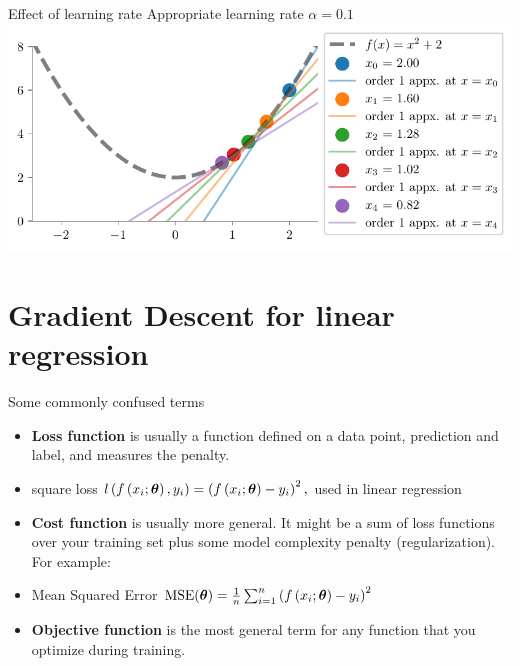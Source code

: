 \documentclass[usenames,dvipsnames]{beamer}
\begin{document}
    \begin{frame}{Effect of learning rate}
        Appropriate learning rate $\alpha=0.1$
        \includegraphics[scale=0.8]{../../maths/assets/mathematical-ml/figures/gd-lr-0.1.pdf}
      \end{frame}

  \section{Gradient Descent for linear regression}
  \begin{frame}{Some commonly confused terms}

    \begin{itemize}[<+->]
        \item \textbf{Loss function} is usually a function defined on a data point, prediction and label, and measures the penalty. 
        \item square loss \(l\left(f\left(x_{i} ; \boldsymbol{\theta}\right), y_{i}\right)=\left(f\left(x_{i} ; \boldsymbol{\theta}\right)-y_{i}\right)^{2},\) used in linear regression
        \item \textbf{Cost function} is usually more general. It might be a sum of loss functions over your training set plus some model complexity penalty (regularization). For example:
        \item Mean Squared Error \(\operatorname{MSE}(\boldsymbol{\theta})=\frac{1}{n} \sum_{i=1}^{n}\left(f\left(x_{i} ; \boldsymbol{\theta}\right)-y_{i}\right)^{2}\)
        \item \textbf{Objective function} is the most general term for any function that you optimize during training.
    \end{itemize}
    
    \end{frame}
\end{document}
